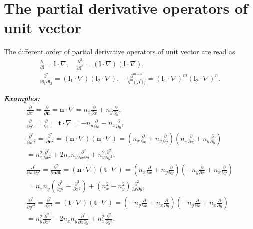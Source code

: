 \documentclass[review]{elsarticle}
\begin{document}
\section{The partial derivative operators of unit vector}
The different order of partial derivative operators of unit vector are read as
\begin{equation}\label{partlO1}
	\begin{gathered}
		\frac{\partial}{\partial \bm{l}} = \bm{l}\cdot \nabla,\quad 
		\frac{\partial^2}{\partial \bm{l}^2} = \left(\bm{l}\cdot \nabla\right)\left(\bm{l}\cdot \nabla\right),\\
		\frac{\partial^2}{\partial \bm{l}_1\partial \bm{l}_2} = \left(\bm{l}_1\cdot \nabla\right)\left(\bm{l}_2\cdot \nabla\right),\quad 
		\frac{\partial^{m+n}}{\partial^m \bm{l}_1\partial^n \bm{l}_2} = \left(\bm{l}_1\cdot \nabla\right)^m\left(\bm{l}_2\cdot \nabla\right)^n.
	\end{gathered}
\end{equation}

\textit{\textbf{Examples:}}\\
\begin{equation}\label{partialxmyn}
	\begin{gathered}
		\frac{\partial}{\partial x'} = \frac{\partial}{\partial \bm{n}}
			=\bm{n} \cdot \nabla = n_x\frac{\partial}{\partial x}+n_y\frac{\partial}{\partial y},\\
		\frac{\partial}{\partial y'} = \frac{\partial}{\partial \bm{t}}
			=\bm{t} \cdot \nabla = -n_y\frac{\partial}{\partial x}+n_x\frac{\partial}{\partial y},\\
		\frac{\partial^2}{\partial x'^2} = \frac{\partial^2}{\partial\bm{n}^2} 
			=\left(\bm{n} \cdot \nabla\right)\left(\bm{n} \cdot \nabla\right)
			=\left(n_x\frac{\partial}{\partial x}+n_y\frac{\partial}{\partial y}\right)\left(n_x\frac{\partial}{\partial x}+n_y\frac{\partial}{\partial y}\right)\\
			=n_x^2\frac{\partial^2}{\partial x^2}+2n_xn_y\frac{\partial^2}{\partial x\partial y}+n_y^2\frac{\partial^2}{\partial y^2},\\
		\frac{\partial^2}{\partial x'\partial y'} = \frac{\partial^2}{\partial\bm{n}\partial \bm{t}} 
			=\left(\bm{n} \cdot \nabla\right)\left(\bm{t} \cdot \nabla\right)
			=\left(n_x\frac{\partial}{\partial x}+n_y\frac{\partial}{\partial y}\right)\left(-n_y\frac{\partial}{\partial x}+n_x\frac{\partial}{\partial y}\right)\\
			=n_xn_y\left(\frac{\partial^2}{\partial y^2}-\frac{\partial^2}{\partial x^2}\right)+\left(n_x^2-n_y^2\right)\frac{\partial^2}{\partial x\partial y},\\
		\frac{\partial^2}{\partial y'^2} = \frac{\partial^2}{\partial\bm{t}^2} 
			=\left(\bm{t} \cdot \nabla\right)\left(\bm{t} \cdot \nabla\right)
			=\left(-n_y\frac{\partial}{\partial x}+n_x\frac{\partial}{\partial y}\right)\left(-n_y\frac{\partial}{\partial x}+n_x\frac{\partial}{\partial y}\right)\\
			=n_y^2\frac{\partial^2}{\partial x^2}-2n_xn_y\frac{\partial^2}{\partial x\partial y}+n_x^2\frac{\partial^2}{\partial y^2}.
	\end{gathered}
\end{equation}
\end{document}
